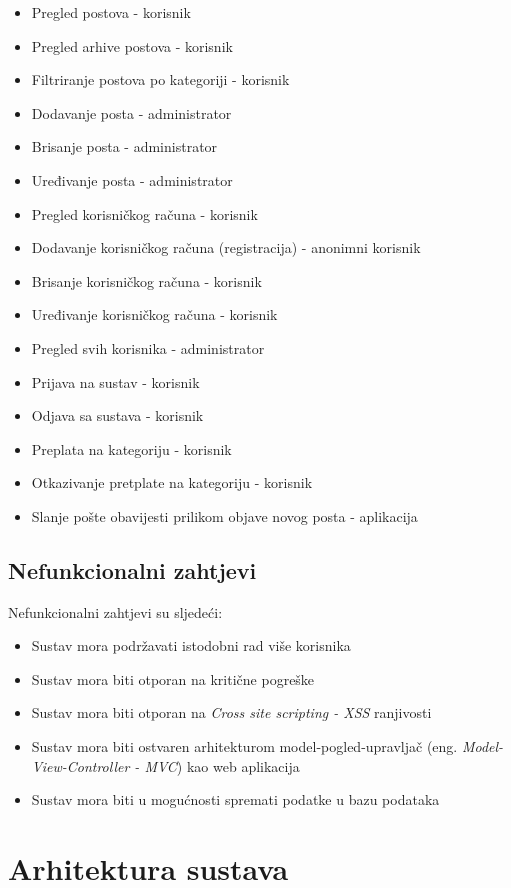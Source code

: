 \documentclass[zavrsni, numeric]{fer}
\begin{document}
 
\begin{itemize}
	\item Pregled postova - korisnik
	\item Pregled arhive postova - korisnik
	\item Filtriranje postova po kategoriji - korisnik
	\item Dodavanje posta - administrator
	\item Brisanje posta - administrator
	\item Uređivanje posta - administrator
	\item Pregled korisničkog računa - korisnik
	\item Dodavanje korisničkog računa (registracija) - anonimni korisnik
	\item Brisanje korisničkog računa - korisnik 
	\item Uređivanje korisničkog računa - korisnik
	\item Pregled svih korisnika - administrator
	\item Prijava na sustav - korisnik 
	\item Odjava sa sustava - korisnik
	\item Preplata na kategoriju - korisnik
	\item Otkazivanje pretplate na kategoriju - korisnik
	\item Slanje pošte obavijesti prilikom objave novog posta - aplikacija
\end{itemize}

\section{Nefunkcionalni zahtjevi}
Nefunkcionalni zahtjevi su sljedeći:

\begin{itemize}
	\item Sustav mora podržavati istodobni rad više korisnika
	\item Sustav mora biti otporan na kritične pogreške
	\item Sustav mora biti otporan na \textit{Cross site scripting - XSS}\citep{xss} ranjivosti
	\item Sustav mora biti ostvaren arhitekturom model-pogled-upravljač (eng. \textit{Model-View-Controller - MVC}) kao web aplikacija
	\item Sustav mora biti u mogućnosti spremati podatke u bazu podataka
\end{itemize}

\chapter{Arhitektura sustava}
\end{document}
